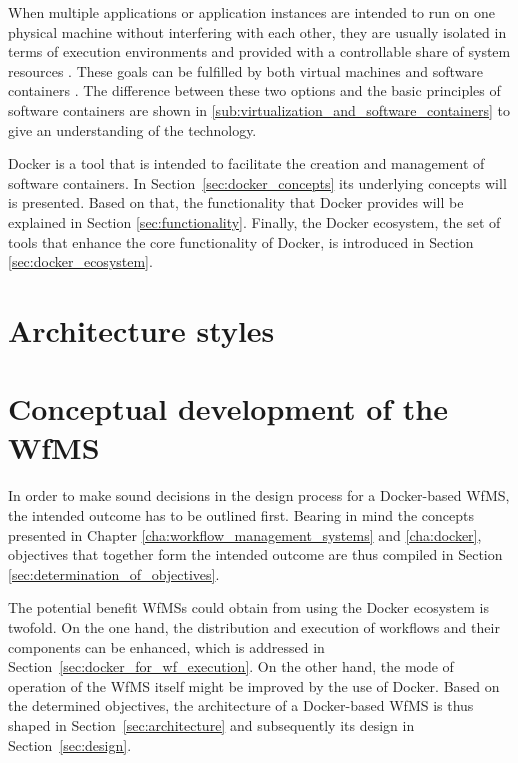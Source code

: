 \documentclass[language=english,noinputenc]{wiwwuwordrprt}
\begin{document}
    When multiple applications or application instances are intended to run on one physical machine without interfering with each other, they are usually isolated in terms of execution environments and provided with a controllable share of system resources \cite{Felter2014Updated}. These goals can be fulfilled by both virtual machines and software containers \cite{Ruiz2015Performance}. The difference between these two options and the basic principles of software containers are shown in \ref{sub:virtualization_and_software_containers} to give an understanding of the technology.

    Docker is a tool that is intended to facilitate the creation and management of software containers. In Section~\ref{sec:docker_concepts} its underlying concepts will is presented. Based on that, the functionality that Docker provides will be explained in Section \ref{sec:functionality}. Finally, the Docker ecosystem, \ie the set of tools that enhance the core functionality of Docker, is introduced in Section \ref{sec:docker_ecosystem}.

    

  \chapter{Architecture styles} %
  \label{cha:architecture_styles}
    


  \chapter{Conceptual development of the WfMS} %
    \label{cha:solution_design}

    In order to make sound decisions in the design process for a Docker-based \ac{WfMS}, the intended outcome has to be outlined first. Bearing in mind the concepts presented in Chapter \ref{cha:workflow_management_systems} and \ref{cha:docker}, objectives that together form the intended outcome are thus compiled in Section \ref{sec:determination_of_objectives}.

    The potential benefit \acp{WfMS} could obtain from using the Docker ecosystem is twofold.
    On the one hand, the distribution and execution of workflows and their components can be enhanced, which is addressed in Section~\ref{sec:docker_for_wf_execution}.
    On the other hand, the mode of operation of the \ac{WfMS} itself might be improved by the use of Docker.
    Based on the determined objectives, the architecture of a Docker-based \ac{WfMS} is thus shaped in Section~\ref{sec:architecture} and subsequently its design in Section~\ref{sec:design}.
\end{document}
